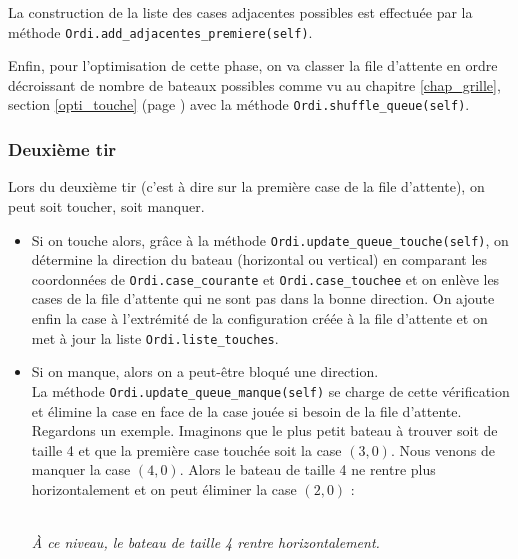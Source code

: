 La construction de la liste des cases adjacentes possibles est effectuée par la méthode \texttt{Ordi.add\_adjacentes\_premiere(self)}.

\medskip

 Enfin, pour l'optimisation de cette phase, on va classer la file d'attente en ordre décroissant de nombre de bateaux possibles comme vu au chapitre \ref{chap_grille}, section \ref{opti_touche} (page \pageref{opti_touche}) avec la méthode \texttt{Ordi.shuffle\_queue(self)}.

\subsubsection{Deuxième tir}
Lors du deuxième tir (c'est à dire sur la première case de la file d'attente), on peut soit toucher, soit manquer.
\begin{itemize}
\item Si on touche alors, grâce à la méthode \texttt{Ordi.update\_queue\_touche(self)}, on détermine la direction du bateau (horizontal ou vertical) en comparant les coordonnées de \texttt{Ordi.case\_courante} et \texttt{Ordi.case\_touchee} et on enlève les cases de la file d'attente qui ne sont pas dans la bonne direction. On ajoute enfin la case à l'extrémité de la configuration créée à la file d'attente et on met à jour la liste \texttt{Ordi.liste\_touches}. 
\item Si on manque, alors on a peut-être bloqué une direction.\\
La méthode \texttt{Ordi.update\_queue\_manque(self)} se charge de cette vérification et élimine la case en face de la case jouée si besoin de la file d'attente.\\
Regardons un exemple. Imaginons que le plus petit bateau à trouver soit de taille 4 et que la première case touchée soit la case $(3,0)$. Nous venons de manquer la case $(4,0)$. Alors le bateau de taille 4 ne rentre plus horizontalement et on peut éliminer la case $(2,0)$ :

\begin{center}
\\
\textit{À ce niveau, le bateau de taille 4 rentre horizontalement.}
\end{center}
\medskip
\begin{center}
\end{center}
\end{itemize}
